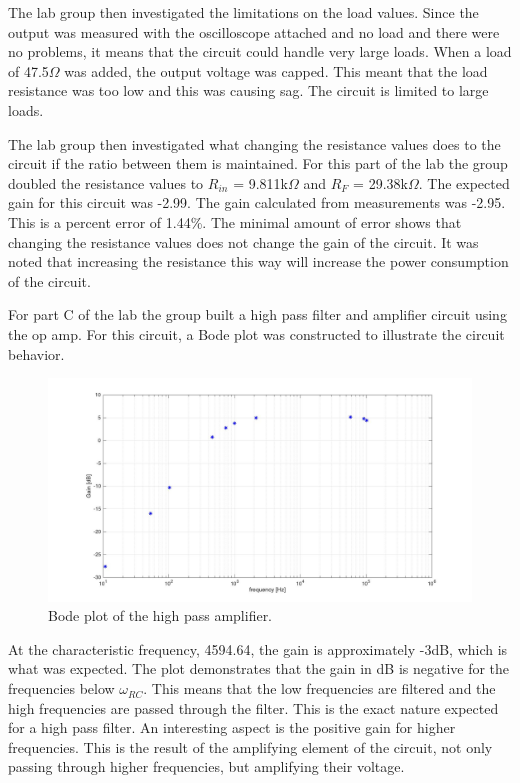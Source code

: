 \documentclass[twocolumn, amsmath]{revtex4}
\begin{document}
The lab group then investigated the limitations on the load values. Since the output was measured with the oscilloscope attached and no load and there were no problems, it means that the circuit could handle very large loads. When a load of 47.5$\Omega$ was added, the output voltage was capped. This meant that the load resistance was too low and this was causing sag. The circuit is limited to large loads. 

The lab group then investigated what changing the resistance values does to the circuit if the ratio between them is maintained. For this part of the lab the group doubled the resistance values to $R_{in}$ = 9.811k$\Omega$ and $R_{F}$ = 29.38k$\Omega$. The expected gain for this circuit was -2.99. The gain calculated from measurements was -2.95. This is a percent error of  1.44\%. The minimal amount of error shows that changing the resistance values does not change the gain of the circuit. It was noted that increasing the resistance this way will increase the power consumption of the circuit.

For part C of the lab the group built a high pass filter and amplifier circuit using the op amp. For this circuit, a Bode plot was constructed to illustrate the circuit behavior.

\begin{figure}[h]
    \includegraphics[scale=0.15]{bode_plot.jpg}  
    \caption{Bode plot of the high pass amplifier.}
\end{figure}

At the characteristic frequency, 4594.64, the gain is approximately -3dB, which is what was expected. The plot demonstrates that the gain in dB is negative for the frequencies below $\omega_{RC}$. This means that the low frequencies are filtered and the high frequencies are passed through the filter. This is the exact nature expected for a high pass filter. An interesting aspect is the positive gain for higher frequencies. This is the result of the amplifying element of the circuit, not only passing through higher frequencies, but amplifying their voltage.
\end{document}
